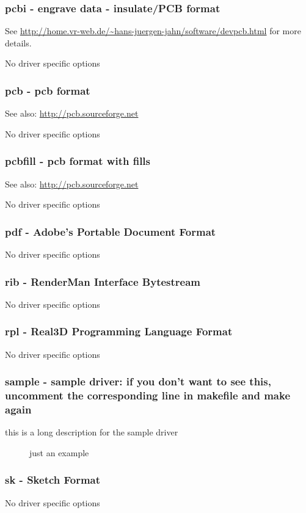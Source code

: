 \documentclass[english,a4paper]{article}
\let\URL\url \let\Email\url \let\File\url
\begin{document}
\subsubsection{pcbi - engrave data - insulate/PCB format}
See \URL{http://home.vr-web.de/~hans-juergen-jahn/software/devpcb.html} for more details.

No driver specific options
\subsubsection{pcb - pcb format}
See also: \URL{http://pcb.sourceforge.net} 

No driver specific options
\subsubsection{pcbfill - pcb format with fills}
See also: \URL{http://pcb.sourceforge.net} 

No driver specific options
\subsubsection{pdf - Adobe's Portable Document Format}
No driver specific options
\subsubsection{rib - RenderMan Interface Bytestream}
No driver specific options
\subsubsection{rpl - Real3D Programming Language Format}
No driver specific options
\subsubsection{sample - sample driver: if you don't want to see this, uncomment the corresponding line in makefile and make again}
this is a long description for the sample driver

\begin{description}
\item[] 
just an example


\end{description}
\subsubsection{sk - Sketch Format}
No driver specific options
\end{document}
